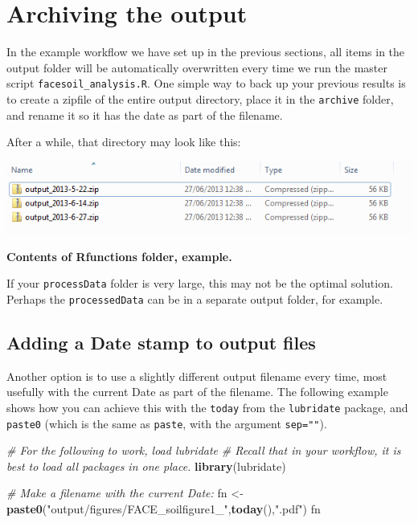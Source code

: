 \documentclass[]{book}
\newenvironment{Shaded}{\begin{snugshade}}{\end{snugshade}}
\newcommand{\CommentTok}[1]{\textcolor[rgb]{0.56,0.35,0.01}{\textit{#1}}}
\newcommand{\KeywordTok}[1]{\textcolor[rgb]{0.13,0.29,0.53}{\textbf{#1}}}
\newcommand{\NormalTok}[1]{#1}
\newcommand{\StringTok}[1]{\textcolor[rgb]{0.31,0.60,0.02}{#1}}
\begin{document}
\hypertarget{archiving-the-output}{%
\section{Archiving the output}\label{archiving-the-output}}

In the example workflow we have set up in the previous sections, all items in the output folder will be automatically overwritten every time we run the master script \texttt{facesoil\_analysis.R}. One simple way to back up your previous results is to create a zipfile of the entire output directory, place it in the \texttt{archive} folder, and rename it so it has the date as part of the filename.

After a while, that directory may look like this:

\includegraphics[width=0.7\linewidth]{screenshots/archive}

\textbf{Contents of Rfunctions folder, example.}

If your \texttt{processData} folder is very large, this may not be the optimal solution. Perhaps the \texttt{processedData} can be in a separate output folder, for example.

\hypertarget{adding-a-date-stamp-to-output-files}{%
\subsection{Adding a Date stamp to output files}\label{adding-a-date-stamp-to-output-files}}

Another option is to use a slightly different output filename every time, most usefully with the current Date as part of the filename. The following example shows how you can achieve this with the \texttt{today} from the \texttt{lubridate} package, and \texttt{paste0} (which is the same as \texttt{paste}, with the argument \texttt{sep=""}).

\begin{Shaded}
\begin{Highlighting}[]
\CommentTok{# For the following to work, load lubridate}
\CommentTok{# Recall that in your workflow, it is best to load all packages in one place.}
\KeywordTok{library}\NormalTok{(lubridate)}

\CommentTok{# Make a filename with the current Date:}
\NormalTok{fn <-}\StringTok{ }\KeywordTok{paste0}\NormalTok{(}\StringTok{"output/figures/FACE_soilfigure1_"}\NormalTok{,}\KeywordTok{today}\NormalTok{(),}\StringTok{".pdf"}\NormalTok{)}
\NormalTok{fn}
\end{Highlighting}
\end{Shaded}
\end{document}
